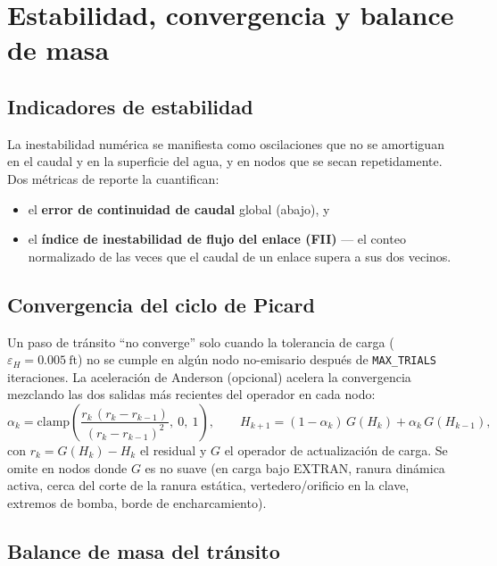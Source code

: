 \documentclass[11pt,a4paper]{article}
\newcommand{\ft}{\mathrm{ft}}
\begin{document}
\section{Estabilidad, convergencia y balance de masa}

\subsection{Indicadores de estabilidad}

La inestabilidad numérica se manifiesta como oscilaciones que no se amortiguan
en el caudal y en la superficie del agua, y en nodos que se secan repetidamente.
Dos métricas de reporte la cuantifican:
\begin{itemize}[nosep]
  \item el \textbf{error de continuidad de caudal} global (abajo), y
  \item el \textbf{índice de inestabilidad de flujo del enlace (FII)} --- el
        conteo normalizado de las veces que el caudal de un enlace supera a sus
        dos vecinos.
\end{itemize}

\subsection{Convergencia del ciclo de Picard}

Un paso de tránsito ``no converge'' solo cuando la tolerancia de carga
($\varepsilon_H = 0.005\ \ft$) no se cumple en algún nodo no-emisario después de
\texttt{MAX\_TRIALS} iteraciones. La aceleración de Anderson (opcional) acelera
la convergencia mezclando las dos salidas más recientes del operador en cada
nodo:
\begin{equation}
  \alpha_k = \mathrm{clamp}\!\left(
    \frac{r_k\,(r_k - r_{k-1})}{(r_k - r_{k-1})^{2}},\ 0,\ 1\right),
  \qquad
  H_{k+1} = (1-\alpha_k)\,G(H_k) + \alpha_k\,G(H_{k-1}),
\end{equation}
con $r_k = G(H_k) - H_k$ el residual y $G$ el operador de actualización de
carga. Se omite en nodos donde $G$ es no suave (en carga bajo EXTRAN, ranura
dinámica activa, cerca del corte de la ranura estática, vertedero/orificio en
la clave, extremos de bomba, borde de encharcamiento).

\subsection{Balance de masa del tránsito}
\end{document}
